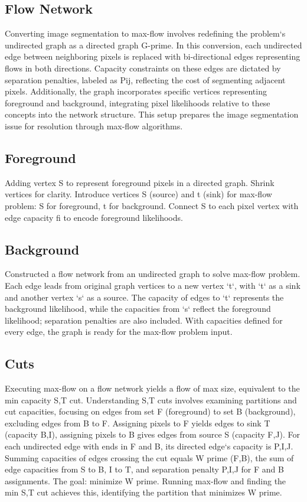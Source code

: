 \subsection*{Flow Network}
Converting image segmentation to max-flow involves redefining the problem`s undirected graph as a directed graph G-prime.
In this conversion, each undirected edge between neighboring pixels is replaced with bi-directional edges representing flows in both directions.
Capacity constraints on these edges are dictated by separation penalties, labeled as Pij, reflecting the cost of segmenting adjacent pixels.
Additionally, the graph incorporates specific vertices representing foreground and background, integrating pixel likelihoods relative to these concepts into the network structure.
This setup prepares the image segmentation issue for resolution through max-flow algorithms.

\subsection*{Foreground}
Adding vertex S to represent foreground pixels in a directed graph.
Shrink vertices for clarity.
Introduce vertices S (source) and t (sink) for max-flow problem: S for foreground, t for background.
Connect S to each pixel vertex with edge capacity fi to encode foreground likelihoods.

\subsection*{Background}
Constructed a flow network from an undirected graph to solve max-flow problem.
Each edge leads from original graph vertices to a new vertex `t`, with `t` as a sink and another vertex `s` as a source.
The capacity of edges to `t` represents the background likelihood, while the capacities from `s` reflect the foreground likelihood; separation penalties are also included.
With capacities defined for every edge, the graph is ready for the max-flow problem input.

\subsection*{Cuts}
Executing max-flow on a flow network yields a flow of max size, equivalent to the min capacity S,T cut.
Understanding S,T cuts involves examining partitions and cut capacities, focusing on edges from set F (foreground) to set B (background), excluding edges from B to F\@.
Assigning pixels to F yields edges to sink T (capacity B,I), assigning pixels to B gives edges from source S (capacity F,J).
For each undirected edge with ends in F and B, its directed edge`s capacity is P,I,J\@.
Summing capacities of edges crossing the cut equals W prime (F,B), the sum of edge capacities from S to B, I to T, and separation penalty P,I,J for F and B assignments.
The goal: minimize W prime.
Running max-flow and finding the min S,T cut achieves this, identifying the partition that minimizes W prime.

